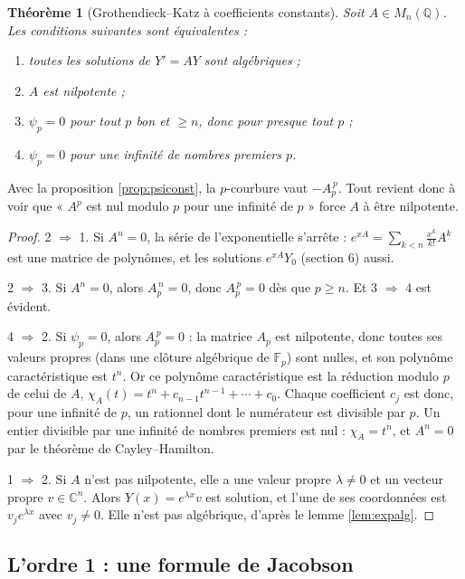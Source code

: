 \documentclass[11pt,a4paper]{article}
\theoremstyle{plain}
\newtheorem{theoreme}{Théorème}[section]
\theoremstyle{definition}
\theoremstyle{remark}
\newcommand{\Q}{\mathbb{Q}}
\newcommand{\C}{\mathbb{C}}
\newcommand{\F}{\mathbb{F}}
\begin{document}
\begin{theoreme}[Grothendieck--Katz à coefficients constants]\label{thm:gkconst}
Soit $A \in M_n(\Q)$. Les conditions suivantes sont équivalentes :
\begin{enumerate}[nosep]
\item toutes les solutions de $Y' = AY$ sont algébriques ;
\item $A$ est nilpotente ;
\item $\psi_p = 0$ pour tout $p$ bon et $\geq n$, donc pour presque tout $p$ ;
\item $\psi_p = 0$ pour une infinité de nombres premiers $p$.
\end{enumerate}
\end{theoreme}

Avec la proposition \ref{prop:psiconst}, la $p$-courbure vaut $-A_p^{\,p}$. Tout revient donc à voir que « $A^p$ est nul modulo $p$ pour une infinité de $p$ » force $A$ à être nilpotente.

\begin{proof}
2 $\Rightarrow$ 1. Si $A^n = 0$, la série de l'exponentielle s'arrête : $e^{xA} = \sum_{k<n} \frac{x^k}{k!} A^k$ est une matrice de polynômes, et les solutions $e^{xA} Y_0$ (section 6) aussi.

2 $\Rightarrow$ 3. Si $A^n = 0$, alors $A_p^{\,n} = 0$, donc $A_p^{\,p} = 0$ dès que $p \geq n$. Et 3 $\Rightarrow$ 4 est évident.

4 $\Rightarrow$ 2. Si $\psi_p = 0$, alors $A_p^{\,p} = 0$ : la matrice $A_p$ est nilpotente, donc toutes ses valeurs propres (dans une clôture algébrique de $\F_p$) sont nulles, et son polynôme caractéristique est $t^n$. Or ce polynôme caractéristique est la réduction modulo $p$ de celui de $A$, $\chi_A(t) = t^n + c_{n-1}t^{n-1} + \cdots + c_0$. Chaque coefficient $c_j$ est donc, pour une infinité de $p$, un rationnel dont le numérateur est divisible par $p$. Un entier divisible par une infinité de nombres premiers est nul : $\chi_A = t^n$, et $A^n = 0$ par le théorème de Cayley--Hamilton.

1 $\Rightarrow$ 2. Si $A$ n'est pas nilpotente, elle a une valeur propre $\lambda \neq 0$ et un vecteur propre $v \in \C^n$. Alors $Y(x) = e^{\lambda x} v$ est solution, et l'une de ses coordonnées est $v_j e^{\lambda x}$ avec $v_j \neq 0$. Elle n'est pas algébrique, d'après le lemme \ref{lem:expalg}.
\end{proof}

\subsection{L'ordre 1 : une formule de Jacobson}
\end{document}
